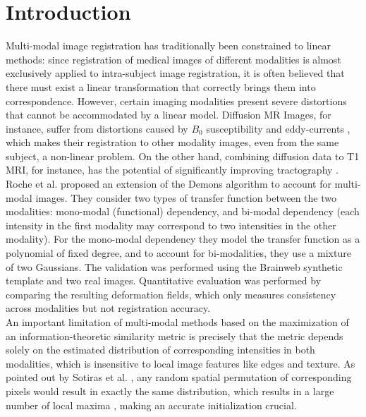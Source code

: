 \section{Introduction}

Multi-modal image registration has traditionally been constrained to linear methods: since registration of medical images of different modalities is almost exclusively
applied to intra-subject image registration, it is often believed that there must exist a linear transformation that correctly brings them into correspondence. However,
certain imaging modalities present severe distortions that cannot be accommodated by a linear model. Diffusion MR Images, for instance, suffer from distortions caused by
$B_{0}$ susceptibility and eddy-currents \cite{Tournier2011}\cite{Andersson2003}, which makes their registration to other modality images, even from the same subject,
a non-linear problem. On the other hand, combining diffusion data to T1 MRI, for instance, has the potential of significantly improving tractography \cite{Smith2012}.\\

Roche et al.\cite{Roche2004a} proposed an extension of the Demons algorithm to account for multi-modal images. They consider two types of transfer function between the two
modalities: mono-modal (functional) dependency, and bi-modal dependency (each intensity in the first modality may correspond to two intensities in the other modality).
For the mono-modal dependency they model the transfer function as a polynomial of fixed degree, and to account for bi-modalities, they use a mixture of two Gaussians.
The validation was performed using the Brainweb synthetic template \cite{Cocosco1997}\cite{Kwan1999} and two real images. Quantitative evaluation was performed by comparing
the resulting deformation fields, which only measures consistency across modalities but not registration accuracy.\\

An important limitation of multi-modal methods based on the maximization of an information-theoretic similarity metric is precisely that the
metric depends solely on the estimated distribution of corresponding intensities in both modalities, which is insensitive to local image
features like edges and texture. As pointed out by Sotiras et al. \cite{Sotiras2013}, any random spatial permutation of corresponding pixels would
result in exactly the same distribution, which results in a large number of local maxima \cite{Roche1998}, making an accurate initialization crucial.\\

